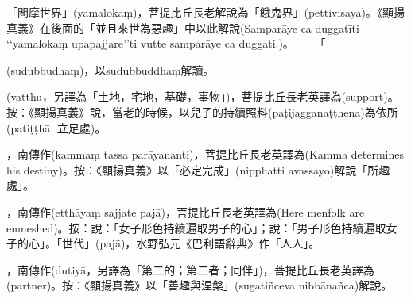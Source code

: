 \startitemgroup[noteitems]
\item{}「閻摩世界」(yamalokaṃ)，菩提比丘長老解說為「餓鬼界」(pettivisaya)。《顯揚真義》在後面的「並且來世為惡趣」中以此解說(Samparāye ca duggatīti ‘‘yamalokaṃ upapajjare’’ti vutte samparāye ca duggati.)。 
　　「
\stopitemgroup

\startitemgroup[noteitems]
\item{}(sudubbudhaṃ)，以sudubbuddhaṃ解讀。
\stopitemgroup

\startitemgroup[noteitems]
\item{}(vatthu，另譯為「土地，宅地，基礎，事物」)，菩提比丘長老英譯為(support)。按：《顯揚真義》說，當老的時候，以兒子的持續照料(paṭijagganaṭṭhena)為依所(patiṭṭhā, 立足處)。
\stopitemgroup

\startitemgroup[noteitems]
\item{}，南傳作(kammaṃ tassa parāyananti)，菩提比丘長老英譯為(Kamma determines his destiny)。按：《顯揚真義》以「必定完成」(nipphatti avassayo)解說「所趣處」。
\stopitemgroup

\startitemgroup[noteitems]
\item{}，南傳作(etthāyaṃ sajjate pajā)，菩提比丘長老英譯為(Here menfolk are enmeshed)。按：說：「女子形色持續遍取男子的心」；說：「男子形色持續遍取女子的心」。「世代」(pajā)，水野弘元《巴利語辭典》作「人人」。
\stopitemgroup

\startitemgroup[noteitems]
\item{}，南傳作(dutiyā，另譯為「第二的；第二者；同伴」)，菩提比丘長老英譯為(partner)。按：《顯揚真義》以「善趣與涅槃」(sugatiñceva nibbānañca)解說。
\stopitemgroup

